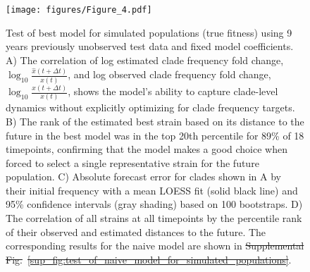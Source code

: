 \documentclass[9pt,lineno]{elife} %
\providecommand{\DIFadd}[1]{{\protect\color{blue}\uwave{#1}}} %
\providecommand{\DIFdel}[1]{{\protect\color{red}\sout{#1}}}                      %
\providecommand{\DIFdelbegin}{} %
\providecommand{\DIFaddFL}[1]{\DIFadd{#1}} %
\providecommand{\DIFdelFL}[1]{\DIFdel{#1}} %
\providecommand{\DIFaddbeginFL}{} %
\providecommand{\DIFaddendFL}{} %
\providecommand{\DIFdelbeginFL}{} %
\providecommand{\DIFdelendFL}{} %
\providecommand{\DIFaddtex}[1]{{\protect\color{blue}\uwave{#1}}} %
\providecommand{\DIFdeltex}[1]{{\protect\color{red}\sout{#1}}}                      %
\providecommand{\DIFdelbegin}{} %
\providecommand{\DIFaddFL}[1]{\DIFadd{#1}} %
\providecommand{\DIFdelFL}[1]{\DIFdel{#1}} %
\providecommand{\DIFaddbeginFL}{} %
\providecommand{\DIFaddendFL}{} %
\providecommand{\DIFdelbeginFL}{} %
\providecommand{\DIFdelendFL}{} %
\providecommand{\DIFadd}[1]{\texorpdfstring{\DIFaddtex{#1}}{#1}} %
\providecommand{\DIFdel}[1]{\texorpdfstring{\DIFdeltex{#1}}{}} %
\newcommand{\DIFscaledelfig}{0.5}
\newlength{\DIFdelgraphicswidth} %
\newlength{\DIFdelgraphicsheight} %
\newcommand{\DIFaddincludegraphics}[2][]{{\color{blue}\fbox{\DIFOincludegraphics[#1]{#2}}}} %
\newcommand{\DIFdelincludegraphics}[2][]{%
\sbox{\DIFdelgraphicsbox}{\DIFOincludegraphics[#1]{#2}}%
\settoboxwidth{\DIFdelgraphicswidth}{\DIFdelgraphicsbox} %
\settoboxtotalheight{\DIFdelgraphicsheight}{\DIFdelgraphicsbox} %
\scalebox{\DIFscaledelfig}{%
\parbox[b]{\DIFdelgraphicswidth}{\usebox{\DIFdelgraphicsbox}\\[-\baselineskip] \rule{\DIFdelgraphicswidth}{0em}}\llap{\resizebox{\DIFdelgraphicswidth}{\DIFdelgraphicsheight}{%
\setlength{\unitlength}{\DIFdelgraphicswidth}%
\begin{picture}(1,1)%
\thicklines\linethickness{2pt} %
{\color[rgb]{1,0,0}\put(0,0){\framebox(1,1){}}}%
{\color[rgb]{1,0,0}\put(0,0){\line( 1,1){1}}}%
{\color[rgb]{1,0,0}\put(0,1){\line(1,-1){1}}}%
\end{picture}%
}\hspace*{3pt}}} %
} %
\DeclareRobustCommand{\DIFdelbegin}{\DIFOdelbegin \let\includegraphics\DIFdelincludegraphics} %
\DeclareRobustCommand{\DIFaddbeginFL}{\DIFOaddbeginFL \let\includegraphics\DIFaddincludegraphics} %
\DeclareRobustCommand{\DIFaddendFL}{\DIFOaddendFL \let\includegraphics\DIFOincludegraphics} %
\DeclareRobustCommand{\DIFdelbeginFL}{\DIFOdelbeginFL \let\includegraphics\DIFdelincludegraphics} %
\DeclareRobustCommand{\DIFdelendFL}{\DIFOaddendFL \let\includegraphics\DIFOincludegraphics} %
\begin{document}
\DIFdelbegin %
\DIFdelendFL \DIFaddbeginFL \begin{figure}
  \texttt{[image: figures/Figure\_4.pdf]}
  \DIFaddendFL \caption{
  Test of best model for simulated populations (true fitness) using 9 years previously unobserved test data and fixed model coefficients.
  A) The correlation of log estimated clade frequency fold change, $\log_{10}{\frac{\hat{x}(t + \Delta{t})}{x(t)}}$, and log observed clade frequency fold change, $\log_{10}{\frac{x(t + \Delta{t})}{x(t)}}$, shows the model's ability to capture clade-level dynamics without explicitly optimizing for clade frequency targets.
  B) The rank of the estimated best strain based on its distance to the future in the best model was in the top 20th percentile for 89\% of 18 timepoints, confirming that the model makes a good choice when forced to select a single representative strain for the future population.
  C) Absolute forecast error for clades shown in A by their initial frequency with a mean LOESS fit (solid black line) and 95\% confidence intervals (gray shading) based on 100 bootstraps.
  D) The correlation of all strains at all timepoints by the percentile rank of their observed and estimated distances to the future.
  The corresponding results for the naive model are shown in \DIFdelbeginFL \DIFdelFL{Supplemental Fig.}\DIFdelendFL \DIFaddbeginFL \DIFaddFL{Figure}\DIFaddendFL ~\DIFdelbeginFL \DIFdelFL{\ref{sup_fig:test_of_naive_model_for_simulated_populations}}\DIFdelendFL \DIFaddbeginFL \DIFaddFL{\ref{fig:test_of_best_model_for_simulated_populations}-Figure supplement~\ref{figsupp:test_of_naive_model_for_simulated_populations}}\DIFaddendFL .
  }
  \label{fig:test_of_best_model_for_simulated_populations}
\DIFdelbeginFL %
\DIFdelendFL \DIFaddbeginFL 


\end{figure}
\end{document}
